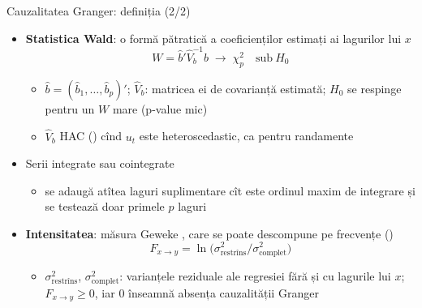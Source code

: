 \begin{frame}{Cauzalitatea Granger: definiția (2/2)}
\itemsize{\small}
\begin{itemize}
    \item \textbf{Statistica Wald}: o formă pătratică a coeficienților estimați ai lagurilor lui $x$ \[ W = \hat b'\hat V_b^{-1}\hat b \;\to\; \chi^2_p \quad \text{sub} \ H_0 \]
    \begin{itemize}
        \item $\hat b = (\hat b_1, \dots, \hat b_p)'$; $\hat V_b$: matricea ei de covarianță estimată; $H_0$ se respinge pentru un $W$ mare (p-value mic)
        \item $\hat V_b$ HAC () cînd $u_t$ este heteroscedastic, ca pentru randamente 
    \end{itemize}
    \item Serii integrate sau cointegrate 
    \begin{itemize}
        \item se adaugă atîtea laguri suplimentare cît este ordinul maxim de integrare și se testează doar primele $p$ laguri
    \end{itemize}
    \item \textbf{Intensitatea}: măsura Geweke , care se poate descompune pe frecvențe  () \[ F_{x\to y} = \ln\big(\sigma^2_{\mathrm{restrîns}}/\sigma^2_{\mathrm{complet}}\big) \]
    \begin{itemize}
        \item $\sigma^2_{\mathrm{restrîns}}$, $\sigma^2_{\mathrm{complet}}$: varianțele reziduale ale regresiei fără și cu lagurile lui $x$; $F_{x\to y} \ge 0$, iar 0 înseamnă absența cauzalității Granger
    \end{itemize}
\end{itemize}
\end{frame}

